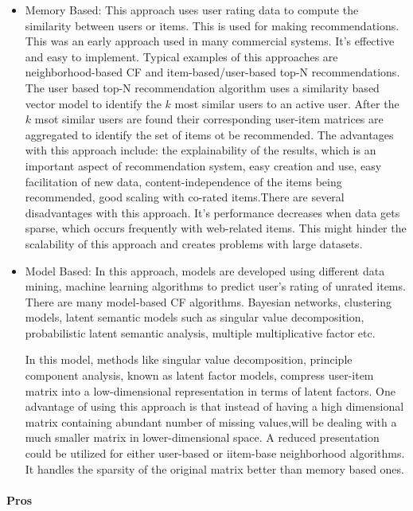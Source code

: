 \begin{itemize}
	\item Memory Based:
		This approach uses user rating data to compute the similarity between users or items. This is used for making recommendations. This was an early approach used in many commercial systems. It's effective and easy to implement. Typical examples of this approaches are neighborhood-based CF and item-based/user-based top-N recommendations. The user based top-N recommendation algorithm uses a similarity based vector model to identify the $k$ most similar users to an active user. After the $k$ msot similar users are found their corresponding user-item matrices are aggregated to identify the set of items ot be recommended.
The advantages with this approach include: the explainability of the results, which is an important aspect of recommendation system, easy creation and use, easy facilitation of new data, content-independence of the items being recommended, good scaling with co-rated items.There are several disadvantages with this approach. It's performance decreases when data gets sparse, which occurs frequently with web-related items. This might hinder the scalability of this approach and creates problems with large datasets.

\item Model Based:
	In this approach, models are developed using different data mining, machine learning algorithms to predict user's rating of unrated items. There are many model-based CF algorithms. Bayesian networks, clustering models, latent semantic models such as singular value decomposition, probabilistic latent semantic analysis, multiple multiplicative factor etc.

In this model, methods like singular value decomposition, principle component analysis, known as latent factor models, compress user-item matrix into a low-dimensional representation in terms of latent factors. One advantage of using this approach is that instead of having a high dimensional matrix containing abundant number of missing values,will be dealing with a much smaller matrix in lower-dimensional space. A reduced presentation could be utilized for either user-based or iitem-base neighborhood algorithms. It handles the sparsity of the original matrix better than memory based ones.
\end{itemize}

\paragraph{Pros}\hfill

